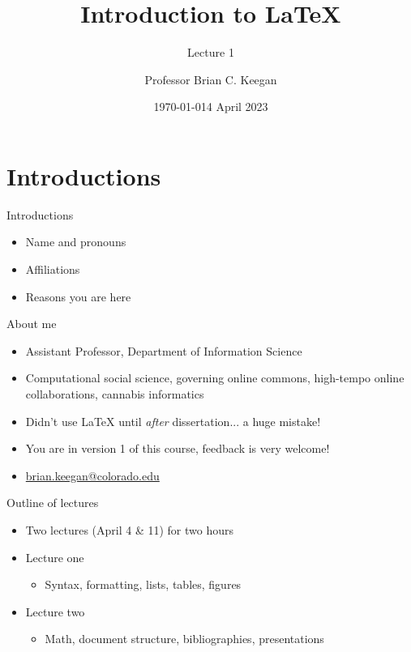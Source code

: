 \documentclass{cubeamer}
\title{Introduction to \LaTeX}
\subtitle{%
Lecture 1
}
\author[Brian Keegan]{Professor Brian C. Keegan}
\date{\today} %
\institute[Information Science]{Department of Information Science}
\date{4 April 2023}
\begin{document}
\maketitle


\section{Introductions}


\begin{frame}{Introductions}
    \begin{itemize}
        \item Name and pronouns
        \item Affiliations
        \item Reasons you are here
    \end{itemize}
\end{frame}

\begin{frame}{About me}
    \begin{itemize}
        \item Assistant Professor, Department of Information Science
        \item Computational social science, governing online commons, high-tempo online collaborations, cannabis informatics
        \item Didn't use \LaTeX{} until \textit{after} dissertation... a huge mistake!
        \item You are in version 1 of this course, feedback is very welcome!
        \item \href{mailto:brian.keegan@colorado.edu}{brian.keegan@colorado.edu}
    \end{itemize}
\end{frame}


\begin{frame}{Outline of lectures}
    \begin{itemize}
        \item Two lectures (April 4 \& 11) for two hours
        \item Lecture one
        \begin{itemize}
            \item Syntax, formatting, lists, tables, figures
        \end{itemize}
        \item Lecture two
        \begin{itemize}
            \item Math, document structure, bibliographies, presentations
        \end{itemize}
    \end{itemize}
\end{frame}
\end{document}
